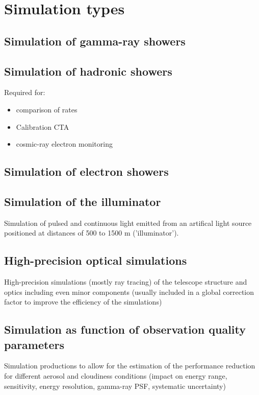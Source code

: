 \section{Simulation types}

\subsection{Simulation of gamma-ray showers}

\subsection{Simulation of hadronic showers}

Required for:

\begin{itemize}
    \item comparison of rates
    \item Calibration CTA
    \item cosmic-ray electron monitoring
\end{itemize}

\subsection{Simulation of electron showers}

\subsection{Simulation of the illuminator}

Simulation of pulsed and continuous light emitted from an artifical light source positioned at distances of 500 to 1500 m ('illuminator').

\subsection{High-precision optical simulations}

High-precision simulations (mostly ray tracing) of the telescope structure and optics including even minor components (usually included in a global correction factor to improve the efficiency of the simulations)

\subsection{Simulation as function of observation quality parameters}

Simulation productions to allow for the estimation of the performance reduction for different aerosol and cloudiness conditions (impact on energy range, sensitivity, energy resolution, gamma-ray PSF, systematic uncertainty)
